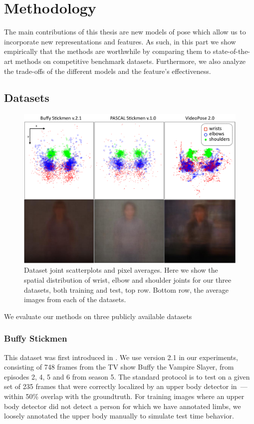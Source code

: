 \chapter{Methodology}
The main contributions of this thesis are new models of pose which allow us to 
incorporate new representations and features.  As such, in this part we show 
empirically that the methods are worthwhile by comparing them to 
state-of-the-art methods on competitive benchmark datasets.  Furthermore, we 
also analyze the trade-offs of the different models and the feature's 
effectiveness.

\section{Datasets}\label{sec:datasets}
\begin{figure}[tb]
\begin{center}
\includegraphics[width=1.05\textwidth]{figs/dataset-scatterplots.pdf}
\caption[Dataset joint scatterplots and pixel averages.]{Dataset joint 
scatterplots and pixel averages.  Here we show the spatial distribution of 
wrist, elbow and shoulder joints for our three datasets, both training and 
test, top row.  Bottom row, the average images from each of the datasets.}
\label{fig:dataset-scatterplots}
\end{center}
\end{figure}



We evaluate our methods on three publicly available datasets

\subsection{Buffy Stickmen}
This dataset was first introduced in \citet{ferrari08}.  We use version 2.1 in 
our experiments, consisting of 748 frames from the TV show Buffy the Vampire 
Slayer, from episodes 2, 4, 5 and 6 from season 5.  The standard protocol is to 
test on a given set of 235 frames that were correctly localized by an upper 
body detector in~\citet{ferrari08}---within 50\% overlap with the groundtruth.  
For training images where an upper body detector did not detect a person for 
which we have annotated limbs, we loosely annotated the upper body manually to 
simulate test time behavior.
  

